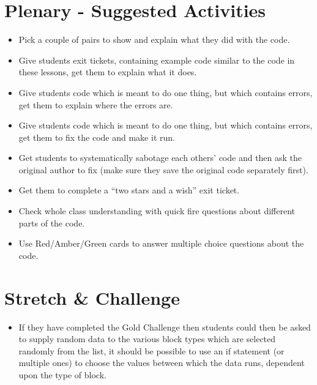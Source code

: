 \documentclass{geocraft-lesson-plan}
\begin{document}
\section*{Plenary - Suggested Activities}
\begin{itemize}
\item Pick a couple of pairs to show and explain what they did with the code. 
\item Give students exit tickets, containing example code similar to the code in these lessons, get them to explain what
  it does.
\item Give students code which is meant to do one thing, but which contains errors, get them to explain where the errors
  are.
\item Give students code which is meant to do one thing, but which contains errors, get them to fix the code and make it
  run. 
\item Get students to systematically sabotage each others' code and then ask the original author to fix (make sure they
  save the original code separately first).
\item Get them to complete a ``two stars and a wish'' exit ticket.
\item Check whole class understanding with quick fire questions about different parts of the code. 
\item Use Red/Amber/Green cards to answer multiple choice questions about the code.
\end{itemize}


\section*{Stretch \& Challenge}
\begin{itemize}
\item If they have completed the Gold Challenge then students could then be asked to supply random data to the various
  block types which are selected randomly from the list, it should be possible to use an if statement (or multiple ones)
  to choose the values between which the data runs, dependent upon the type of block.  
\end{itemize}
\end{document}
